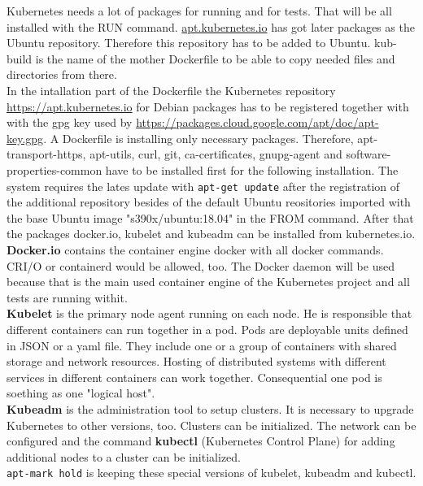 Kubernetes needs a lot of packages for running and for tests. That will be all installed with the RUN command.
\url{apt.kubernetes.io} has got later packages as the Ubuntu repository. Therefore this repository has to be added to Ubuntu. kub-build is the name of the mother Dockerfile to be able to copy needed files and directories from there. \\
In the intallation part of the Dockerfile the Kubernetes repository \url{https://apt.kubernetes.io} for Debian packages has to be registered together with with the gpg key used by  \url{https://packages.cloud.google.com/apt/doc/apt-key.gpg}.
 A Dockerfile is installing only necessary packages. Therefore, apt-transport-https, apt-utils, curl, git, ca-certificates, gnupg-agent and software-properties-common have to be installed first for the following installation.
The system requires the lates update with \lstinline!apt-get update! after the registration of the additional repository besides of the default Ubuntu reositories imported with the base Ubuntu image "s390x/ubuntu:18.04" in the FROM command. After that the packages docker.io, kubelet and kubeadm can be installed from kubernetes.io. \textbf{Docker.io} contains the container engine docker with all docker commands. CRI/O or containerd would be allowed, too. The Docker daemon will be used because that is the main used container engine of the Kubernetes project and all tests are running withit. \\ \textbf{Kubelet} is the primary node agent running on each node. He is responsible that different containers can run together in a pod. Pods are deployable units defined in JSON or a yaml file. They include one or a group of containers with shared storage and network resources. Hosting of distributed systems  with different services in different containers can work together. Consequential one pod is soething as one "logical host". \\
\textbf{Kubeadm} is the administration tool to setup clusters. It is necessary to upgrade Kubernetes to other versions, too. Clusters can be initialized. The network can be configured and the command \textbf{kubectl} (Kubernetes Control Plane) for adding additional nodes to a cluster can be initialized. \\
\lstinline!apt-mark hold! is keeping these special versions of kubelet, kubeadm and kubectl. 

